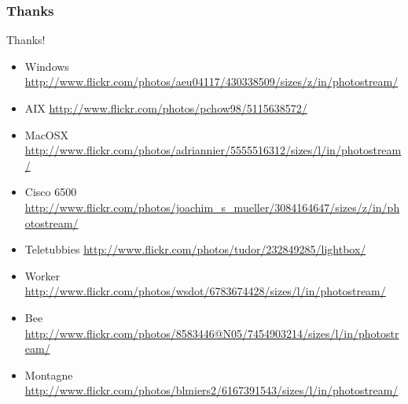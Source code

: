 \documentclass{beamer}
\begin{document}
\begin{frame}
    \frametitle{Thanks}

    \begin{block}{Thanks!}
        \begin{itemize}
            \item Windows \url{http://www.flickr.com/photos/aeu04117/430338509/sizes/z/in/photostream/}
            \item AIX \url{http://www.flickr.com/photos/pchow98/5115638572/}
            \item MacOSX \url{http://www.flickr.com/photos/adriannier/5555516312/sizes/l/in/photostream/}
            \item Cisco 6500 \url{http://www.flickr.com/photos/joachim\_s\_mueller/3084164647/sizes/z/in/photostream/}
            \item Teletubbies \url{http://www.flickr.com/photos/tudor/232849285/lightbox/}
            \item Worker \url{http://www.flickr.com/photos/wsdot/6783674428/sizes/l/in/photostream/}
            \item Bee \url{http://www.flickr.com/photos/8583446@N05/7454903214/sizes/l/in/photostream/}
            \item Montagne \url{http://www.flickr.com/photos/blmiers2/6167391543/sizes/l/in/photostream/} 
        \end{itemize}
    \end{block}
\end{frame}
\end{document}
